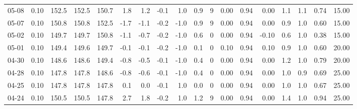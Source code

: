 \begin{threeparttable}
{\begin{tabular}{lrrrrrrrrrrrrrrrrr}
  05-08 &     0.10 & 152.5 & 152.5 & 150.7 &        1.8 &            1.2 &                      -0.1 &                      1.0 &                 0.9 &              9 &       0.00 &      0.94 &           0.00 &              1.1 &                 1.1 &            0.74 &                  15.00 \\
  05-07 &     0.10 & 150.8 & 150.8 & 152.5 &       -1.7 &           -1.1 &                      -0.2 &                     -1.0 &                 0.9 &              9 &       0.00 &      0.94 &           0.00 &              0.9 &                 1.0 &            0.60 &                  15.00 \\
  05-02 &     0.10 & 149.7 & 149.7 & 150.8 &       -1.1 &           -0.7 &                      -0.2 &                     -1.0 &                 0.6 &              0 &       0.00 &      0.94 &          -0.10 &              0.6 &                 1.0 &            0.38 &                  15.00 \\
  05-01 &     0.10 & 149.4 & 149.6 & 149.7 &       -0.1 &           -0.1 &                      -0.2 &                     -1.0 &                 0.1 &              0 &       0.10 &      0.94 &           0.10 &              0.9 &                 1.0 &            0.60 &                  20.00 \\
  04-30 &     0.10 & 148.6 & 148.6 & 149.4 &       -0.8 &           -0.5 &                      -0.1 &                     -1.0 &                 0.4 &              0 &       0.00 &      0.94 &           0.00 &              1.2 &                 1.0 &            0.79 &                  20.00 \\
  04-28 &     0.10 & 147.8 & 147.8 & 148.6 &       -0.8 &           -0.6 &                      -0.1 &                     -1.0 &                 0.4 &              0 &       0.00 &      0.94 &           0.00 &              1.0 &                 0.9 &            0.69 &                  25.00 \\
  04-25 &     0.10 & 147.8 & 147.8 & 147.8 &        0.1 &            0.0 &                      -0.1 &                      1.0 &                 0.0 &              0 &       0.00 &      0.94 &           0.00 &              1.0 &                 1.0 &            0.67 &                  25.00 \\
  04-24 &     0.10 & 150.5 & 150.5 & 147.8 &        2.7 &            1.8 &                      -0.2 &                      1.0 &                 1.2 &              9 &       0.00 &      0.94 &           0.00 &              1.4 &                 1.0 &            0.94 &                  25.00 \\

\end{tabular}}
\end{threeparttable}
